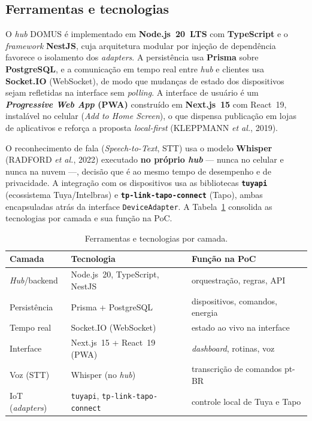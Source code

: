 \subsection{Ferramentas e tecnologias}\label{sec:ferramentas}

O \textit{hub} DOMUS é implementado em \textbf{Node.js~20~LTS} com \textbf{TypeScript} e
o \textit{framework} \textbf{NestJS}, cuja arquitetura modular por injeção de dependência
favorece o isolamento dos \textit{adapters}. A persistência usa \textbf{Prisma} sobre
\textbf{PostgreSQL}, e a comunicação em tempo real entre \textit{hub} e clientes usa
\textbf{Socket.IO} (WebSocket), de modo que mudanças de estado dos dispositivos sejam
refletidas na interface sem \textit{polling}. A interface de usuário é um
\textbf{\textit{Progressive Web App} (PWA)} construído em \textbf{Next.js~15} com
React~19, instalável no celular (\textit{Add to Home Screen}), o que dispensa publicação
em lojas de aplicativos e reforça a proposta \textit{local-first} (KLEPPMANN \textit{et
al.}, 2019).

O reconhecimento de fala (\textit{Speech-to-Text}, STT) usa o modelo \textbf{Whisper}
(RADFORD \textit{et al.}, 2022) executado \textbf{no próprio \textit{hub}} --- nunca no
celular e nunca na nuvem ---, decisão que é ao mesmo tempo de desempenho e de
privacidade. A integração com os dispositivos usa as bibliotecas \textbf{\texttt{tuyapi}}
(ecossistema Tuya/Intelbras) e \textbf{\texttt{tp-link-tapo-connect}} (Tapo), ambas
encapsuladas atrás da interface \texttt{DeviceAdapter}. A Tabela~\ref{tab:stack} consolida
as tecnologias por camada e sua função na PoC.

\begin{table}[H]
\centering
\caption{Ferramentas e tecnologias por camada.}
\label{tab:stack}
\small
\begin{tabular}{@{}p{3.0cm}p{5.0cm}p{4.2cm}@{}}
\toprule
\textbf{Camada} & \textbf{Tecnologia} & \textbf{Função na PoC} \\
\midrule
\textit{Hub}/backend & Node.js~20, TypeScript, NestJS & orquestração, regras, API \\
Persistência & Prisma + PostgreSQL & dispositivos, comandos, energia \\
Tempo real & Socket.IO (WebSocket) & estado ao vivo na interface \\
Interface & Next.js~15 + React~19 (PWA) & \textit{dashboard}, rotinas, voz \\
Voz (STT) & Whisper (no \textit{hub}) & transcrição de comandos pt-BR \\
IoT (\textit{adapters}) & \texttt{tuyapi}, \texttt{tp-link-tapo-connect} & controle local de Tuya e Tapo \\
\bottomrule
\end{tabular}
\end{table}

